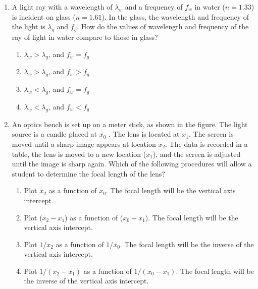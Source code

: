 \documentclass{../../../oss-classkick}
\begin{document}
\begin{multicols*}{2}
\begin{enumerate}[leftmargin=18pt]
  \item A light ray with a wavelength of $\lambda_w$ and a frequency of
    $f_w$ in water ($n=1.33$) is incident on glass ($n=1.61$). In the glass,
    the wavelength and frequency of the light is $\lambda_g$ and $f_g$. How do
    the values of wavelength and frequency of the ray of light in water compare
    to those in glass?
    \begin{enumerate}[nosep,leftmargin=18pt,label=(\Alph*)]
    \item $\lambda_w>\lambda_g$, and $f_w=f_g$
    \item $\lambda_w>\lambda_g$, and $f_w>f_g$
    \item $\lambda_w<\lambda_g$, and $f_w=f_g$
    \item $\lambda_w<\lambda_g$, and $f_w<f_g$
    \end{enumerate}
    \vspace{.7in}
    \columnbreak
    
  \item An optics bench is set up on a meter stick, as shown in the figure. The
    light source is a candle placed at $x_0$ . The lens is located at $x_1$. The
    screen is moved until a sharp image appears at location $x_2$. The data is
    recorded in a table, the lens is moved to a new location ($x_1$), and the
    screen is adjusted until the image is sharp again. Which of the
    following procedures will allow a student to determine the focal length
    of the lens?
    \begin{enumerate}[nosep,leftmargin=18pt,label=(\Alph*)]
    \item Plot $x_2$ as a function of $x_0$. The focal length will be the
      vertical axis intercept.
    \item Plot ($x_2-x_1$) as a function of ($x_0-x_1$). The focal length will
      be the vertical axis intercept.
    \item Plot $1/x_2$ as a function of $1/x_0$. The focal length will be the
      inverse of the vertical axis intercept.
    \item Plot $1/(x_2-x_1)$ as a function of $1/(x_0-x_1)$. The focal length
      will be the inverse of the vertical axis intercept.
    \end{enumerate}
    \vspace{.7in}
    

\end{enumerate}
\end{multicols*}
\end{document}
